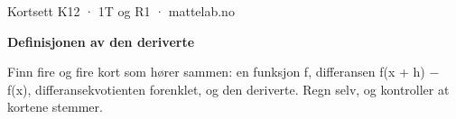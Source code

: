 \documentclass[11pt,a4paper]{article}
\begin{document}
\begin{minipage}[t]{0.8\linewidth}\vspace{0pt}
{\sffamily\small\color{dempet}Kortsett K12 · 1T og R1 · mattelab.no}\par\vspace{0.25em}
{\fontsize{20}{24}\selectfont\bfseries Definisjonen av den deriverte}\par\vspace{0.5em}
Finn fire og fire kort som hører sammen: en funksjon f, differansen f(x + h) − f(x), differansekvotienten forenklet, og den deriverte. Regn selv, og kontroller at kortene stemmer.\par{}
\end{minipage}\hfill
\begin{minipage}[t]{0.15\linewidth}\vspace{0pt}\raggedleft
{}
\end{minipage}\par\vspace{0.8em}
\end{document}

